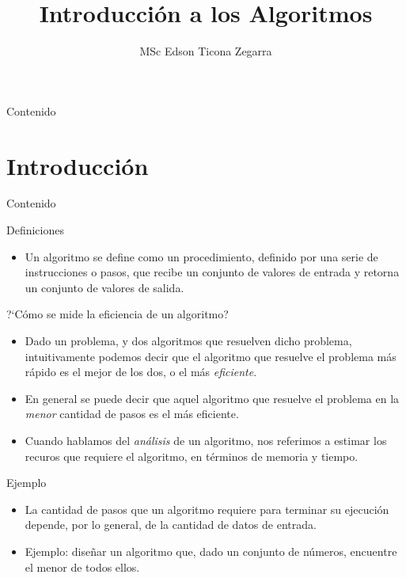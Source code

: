 \documentclass[handout]{beamer}
\title{Introducci\'on a los Algoritmos}
\author{MSc Edson Ticona Zegarra}
\institute{Taller de Programaci\'on 2025}
\date{}
\begin{document}
\maketitle

\begin{frame}{Contenido}
\tableofcontents
\end{frame}

\section{Introducci\'on}
\begin{frame}{Contenido}
\tableofcontents[currentsection]
\end{frame}

\begin{frame}{Definiciones}
\begin{itemize}
  \item Un algoritmo se define como un procedimiento, definido por una serie de instrucciones o pasos, que recibe un conjunto de valores de entrada y retorna un conjunto de valores de salida. 
\end{itemize}
\end{frame}

\begin{frame}{?`C\'omo se mide la eficiencia de un algoritmo?}
\begin{itemize}
  \item Dado un problema, y dos algoritmos que resuelven dicho problema, intuitivamente podemos decir que el algoritmo que resuelve el problema m\'as r\'apido es el mejor de los dos, o el m\'as \textit{eficiente}.
\pause
  \item En general se puede decir que aquel algoritmo que resuelve el problema en la \textit{menor} cantidad de pasos es el m\'as eficiente.
\pause
  \item Cuando hablamos del \textit{an\'alisis} de un algoritmo, nos referimos a estimar los recuros que requiere el algoritmo, en t\'erminos de memoria y tiempo.
\end{itemize}
\end{frame}

\begin{frame}{Ejemplo}
\begin{itemize}
  \item La cantidad de pasos que un algoritmo requiere para terminar su ejecuci\'on depende, por lo general, de la cantidad de datos de entrada.
\pause
  \item Ejemplo: dise\~nar un algoritmo que, dado un conjunto de n\'umeros, encuentre el menor de todos ellos.
\end{itemize}
\end{frame}
\end{document}
